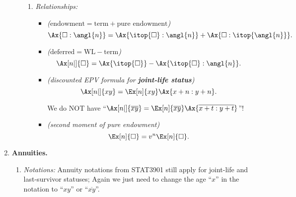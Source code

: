 \begin{enumerate}
\begin{enumerate}[label={(\arabic*)}]
\begin{enumerate}[label={(\roman*)}]
\item \emph{Relationships:} 
\begin{itemize}
\item \emph{(\(\text{endowment}=\text{term}+\text{pure endowment}\))}
\[
\Ax{\square:\angl{n}}=\Ax{\itop{\square}:\angl{n}}+\Ax{\square:\itop{\angl{n}}}.
\]
\item \emph{(\(\text{deferred}=\text{WL}-\text{term}\))}
\[
\Ax[n|]{\square}=\Ax{\itop{\square}}-\Ax{\itop{\square}:\angl{n}}.
\]

\item \emph{(discounted EPV formula for \textbf{joint-life status})}
\[
\Ax[n|]{xy}=\Ex[n]{xy}\Ax{x+n:y+n}.
\]
\begin{warning}
We do NOT have
``\(\Ax[n|]{\overline{xy}}=\Ex[n]{\overline{xy}}\Ax{\overline{x+t:y+t}}\)''!
\end{warning}
\item \emph{(second moment of pure endowment)}
\[
\Ex[n]{\square}=v^{n}\Ex[n]{\square}.
\]
\end{itemize}
\end{enumerate}
\end{enumerate}
\item \textbf{Annuities.}
\begin{enumerate}[label={(\arabic*)}]
\item \emph{Notations:} Annuity notations from STAT3901 still apply for
joint-life and last-survivor statuses; Again we just need to change the age
``\(x\)'' in the notation to ``\(xy\)'' or ``\(\overline{xy}\)''.


\end{enumerate}
\end{enumerate}
